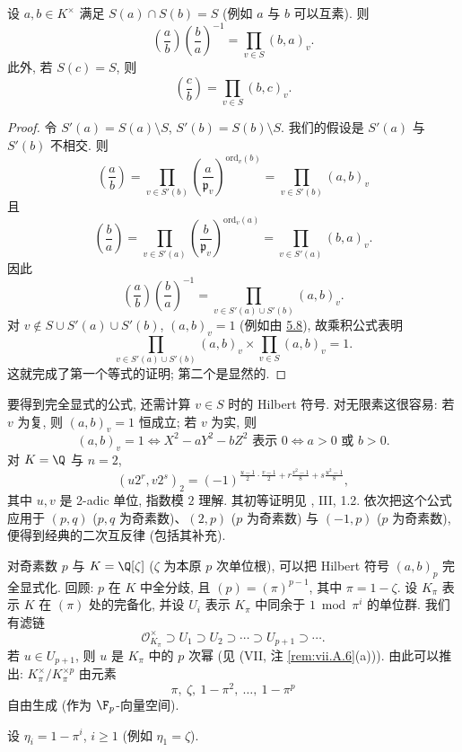 \setcounter{theorem}{10}
\begin{theorem}[幂互反律]\label{thm:viii.5.11}
设 $a,b\in K^{\times}$ 满足 $S(a)\cap S(b)=S$ (例如 $a$ 与 $b$ 可以互素). 则
\[
\left(\frac{a}{b}\right)\left(\frac{b}{a}\right)^{-1}=\prod_{v\in S}(b,a)_{v}.
\]
此外, 若 $S(c)=S$, 则
\[
\left(\frac{c}{b}\right)=\prod_{v\in S}(b,c)_{v}.
\]
\end{theorem}

\begin{proof}
令 $S'(a)=S(a)\setminus S$, $S'(b)=S(b)\setminus S$. 我们的假设是 $S'(a)$ 与 $S'(b)$ 不相交. 则
\[
\left(\frac{a}{b}\right)=\prod_{v\in S'(b)}\left(\frac{a}{\mathfrak{p}_{v}}\right)^{\mathrm{ord}_{v}(b)}=\prod_{v\in S'(b)}(a,b)_{v}
\]
且
\[
\left(\frac{b}{a}\right)=\prod_{v\in S'(a)}\left(\frac{b}{\mathfrak{p}_{v}}\right)^{\mathrm{ord}_{v}(a)}=\prod_{v\in S'(a)}(b,a)_{v}.
\]
因此
\[
\left(\frac{a}{b}\right)\left(\frac{b}{a}\right)^{-1}=\prod_{v\in S'(a)\cup S'(b)}(a,b)_{v}.
\]
对 $v\notin S\cup S'(a)\cup S'(b)$, $(a,b)_v=1$ (例如由 \hyperlink{item:viii.5.8}{5.8}), 故乘积公式表明
\[
\prod_{v\in S'(a)\cup S'(b)}(a,b)_{v}\times\prod_{v\in S}(a,b)_{v}=1.
\]
这就完成了第一个等式的证明; 第二个是显然的.
\end{proof}

要得到完全显式的公式, 还需计算 $v\in S$ 时的 Hilbert 符号. 对无限素这很容易: 若 $v$ 为复, 则 $(a,b)_v=1$ 恒成立; 若 $v$ 为实, 则
\[
(a,b)_{v}=1\iff X^{2}-aY^{2}-bZ^{2} \text{ 表示 } 0\iff a>0 \text{ 或 } b>0.
\]
对 $K=\Q$ 与 $n=2$,
\[
(u2^{r},v2^{s})_{2}=(-1)^{\frac{u-1}{2}\cdot\frac{v-1}{2}+r\frac{v^{2}-1}{8}+s\frac{u^{2}-1}{8}},
\]
其中 $u,v$ 是 2-adic 单位, 指数模 $2$ 理解. 其初等证明见 \cite{Serre1970}, III, 1.2. 依次把这个公式应用于 $(p,q)$ ($p,q$ 为奇素数)、$(2,p)$ ($p$ 为奇素数) 与 $(-1,p)$ ($p$ 为奇素数), 便得到经典的二次互反律 (包括其补充).

对奇素数 $p$ 与 $K=\Q[\zeta]$ ($\zeta$ 为本原 $p$ 次单位根), 可以把 Hilbert 符号 $(a,b)_p$ 完全显式化. 回顾: $p$ 在 $K$ 中全分歧, 且 $(p)=(\pi)^{p-1}$, 其中 $\pi=1-\zeta$. 设 $K_\pi$ 表示 $K$ 在 $(\pi)$ 处的完备化, 并设 $U_i$ 表示 $K_\pi$ 中同余于 $1 \bmod \pi^{i}$ 的单位群. 我们有滤链
\[
\mathcal{O}_{K_{\pi}}^{\times}\supset U_{1}\supset U_{2}\supset\cdots\supset U_{p+1}\supset\cdots.
\]
若 $u\in U_{p+1}$, 则 $u$ 是 $K_\pi$ 中的 $p$ 次幂 (见 (VII, 注 \ref{rem:vii.A.6}(a))). 由此可以推出: $K_\pi^{\times}/K_\pi^{\times p}$ 由元素
\[
\pi,\ \zeta,\ 1-\pi^{2},\ \ldots,\ 1-\pi^{p}
\]
自由生成 (作为 $\F_p$-向量空间).

设 $\eta_i=1-\pi^{i}$, $i\ge 1$ (例如 $\eta_1=\zeta$).

